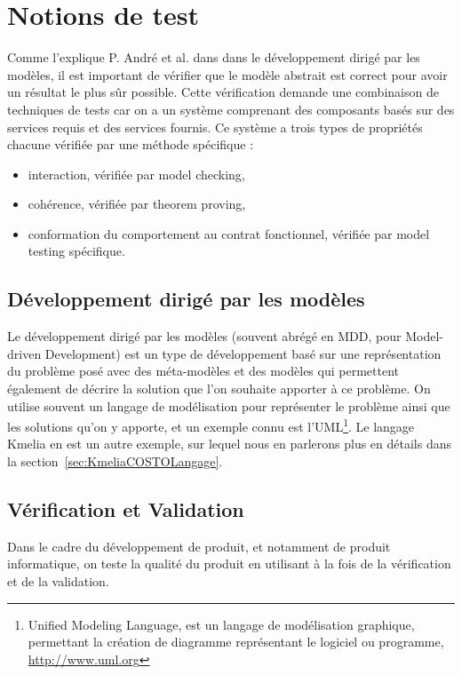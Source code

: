 \section{Notions de test}
\label{sec:notionTest}

    Comme l'explique P. André et al. dans \cite{amaretto17} dans le développement dirigé par les modèles, il est important de vérifier que le modèle abstrait est correct pour avoir un résultat le plus sûr possible.   
    Cette vérification demande une combinaison de techniques de tests car on a un système comprenant des composants basés sur des services requis et des services fournis. Ce système a trois types de propriétés chacune vérifiée par une méthode spécifique : 
    \begin{itemize}[label=\textbullet, font=\large]
        \item interaction, vérifiée par model checking, 
        \item cohérence, vérifiée par theorem proving, 
        \item conformation du comportement au contrat fonctionnel, vérifiée par model testing spécifique.
    \end{itemize}

\subsection*{Développement dirigé par les modèles}
    Le développement dirigé par les modèles (souvent abrégé en MDD, pour Model-driven Development) est un type de développement basé sur une représentation du problème posé avec des méta-modèles et des modèles qui permettent également de décrire la solution que l'on souhaite apporter à ce problème.
    On utilise souvent un langage de modélisation  pour représenter le problème ainsi que les solutions qu'on y apporte, et un exemple connu est l'UML\footnote{Unified Modeling Language, est un langage de modélisation graphique, permettant la création de diagramme représentant le logiciel ou programme, \url{http://www.uml.org}}. Le langage Kmelia en est un autre exemple, sur lequel nous en parlerons plus en détails dans la section~\ref{sec:KmeliaCOSTOLangage}.
    
\subsection*{Vérification et Validation}
    
    Dans le cadre du développement de produit, et notamment de produit informatique, on teste la qualité du produit en utilisant à la fois de la vérification et de la validation.
    
